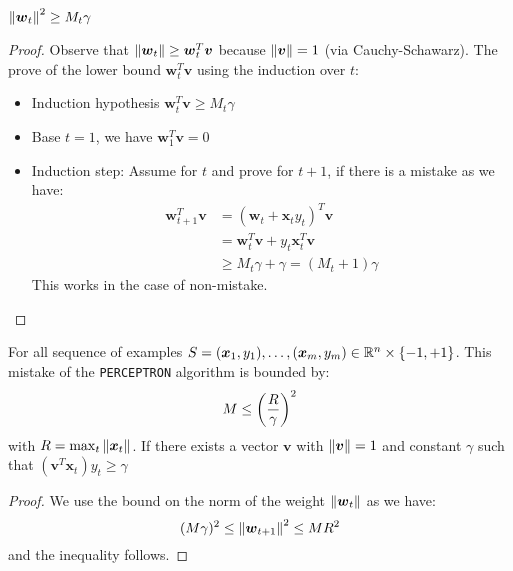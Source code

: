 \begin{lemma}
    $\left\lVert\boldsymbol w_t\right\rVert^2 \ge M_t\gamma$
\end{lemma}
\begin{proof}
    Observe that $\left\lVert\boldsymbol w_t\right\rVert \ge \boldsymbol w_t^T\boldsymbol v$ because $\left\lVert\boldsymbol v\right\rVert = 1$ (via Cauchy-Schawarz). The prove of the lower bound $\boldsymbol w_t^T\boldsymbol v$ using the induction over $t$:
    \begin{itemize}
        \item Induction hypothesis $\boldsymbol w_t^T\boldsymbol v \ge M_t\gamma$
        \item Base $t=1$, we have $\boldsymbol w_1^T\boldsymbol v = 0$
        \item Induction step: Assume for $t$ and prove for $t+1$, if there is a mistake as we have:
        \begin{equation*}
        \begin{aligned}
            \boldsymbol w_{t+1}^T\boldsymbol v &= (\boldsymbol w_t + \boldsymbol x_ty_t)^T\boldsymbol v \\
            &= \boldsymbol w_t^T\boldsymbol v + y_t\boldsymbol x_t^T\boldsymbol v \\
            &\ge M_t\gamma + \gamma = (M_t+1)\gamma
        \end{aligned}
        \end{equation*}
        This works in the case of non-mistake.
    \end{itemize}
\end{proof}

\begin{theorem}
    For all sequence of examples $S = (\boldsymbol x_1,y_1),\dots,(\boldsymbol x_m, y_m) \in \mathbb{R}^n \times \left\{ -1, +1 \right\}$. This mistake of the \texttt{PERCEPTRON} algorithm is bounded by:
    \begin{equation*}
        M \le \left( \frac{R}{\gamma} \right)^2
    \end{equation*}
    with $R = \max_t\left\lVert\boldsymbol x_t\right\rVert$. If there exists a vector $\boldsymbol v$ with $\left\lVert\boldsymbol v\right\rVert = 1$ and constant $\gamma$ such that $(\boldsymbol v^T\boldsymbol x_t)y_t\ge\gamma$
\end{theorem}
\begin{proof}
    We use the bound on the norm of the weight $\left\lVert\boldsymbol w_t\right\rVert$ as we have:
    \begin{equation*}
        (M\gamma)^2 \le \left\lVert\boldsymbol w_{t+1}\right\rVert^2 \le MR^2
    \end{equation*}
    and the inequality follows. 
\end{proof}

